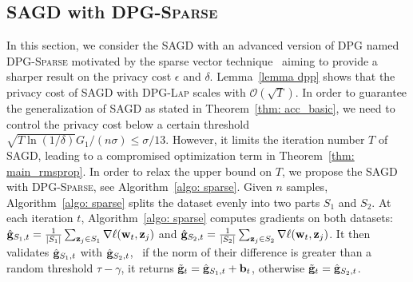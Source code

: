 \documentclass[11pt]{article}
\begin{document}
\vspace{-0.05in}
\subsection{\textsc{SAGD} with \textsc{DPG-Sparse}} \label{subsec: SAGD-sparse}
\vspace{-0.05in}

In this section, we consider the \textsc{SAGD} with an advanced version of \textsc{DPG} named \textsc{DPG-Sparse} motivated by the sparse vector technique~\citep{dwro2014} aiming to provide a sharper result on the privacy cost $\epsilon$ and $\delta$.
Lemma~\ref{lemma dpp} shows that the privacy cost of \textsc{SAGD} with \textsc{DPG-Lap} scales with $\mathcal{O}(\sqrt{T})$. In order to guarantee the generalization of \textsc{SAGD} as stated in Theorem~\ref{thm: acc_basic}, we need to control the privacy cost below a certain threshold \ie $\sqrt{T \ln(1/\delta)} G_1/(n\sigma) \leq \sigma/13$. However, it limits the iteration number $T$ of \textsc{SAGD}, leading to a compromised optimization term in Theorem~\ref{thm: main_rmsprop}.  
In order to relax the upper bound on $T$, we propose the \textsc{SAGD} with \textsc{DPG-Sparse}, see Algorithm~\ref{algo: sparse}.
Given $n$ samples, Algorithm~\ref{algo: sparse} splits the dataset evenly into two parts $S_1$ and $S_2$. 
At each iteration $t$, Algorithm~\ref{algo: sparse} computes gradients on both datasets:
$\hat {\mathbf{g}}_{S_1,t} = \frac{1}{|S_1|} \sum_{\mathbf{z}_j \in S_1}\nabla \ell(\mathbf{w}_t, \mathbf{z}_j)$ and $\hat {\mathbf{g}}_{S_2,t} = \frac{1}{|S_2|} \sum_{\mathbf{z}_j \in S_2}\nabla \ell(\mathbf{w}_t, \mathbf{z}_j)$.
It then validates $\hat {\mathbf{g}}_{S_1,t} $ with $\hat {\mathbf{g}}_{S_2,t}$, \ie\ if the norm of their difference is greater than a random threshold $\tau-\gamma$, it returns $\tilde {\mathbf{g}}_t = \hat {\mathbf{g}}_{S_1,t} + \mathbf{b}_t$, otherwise $\tilde {\mathbf{g}}_t = \hat {\mathbf{g}}_{S_2,t}$.%
\end{document}
